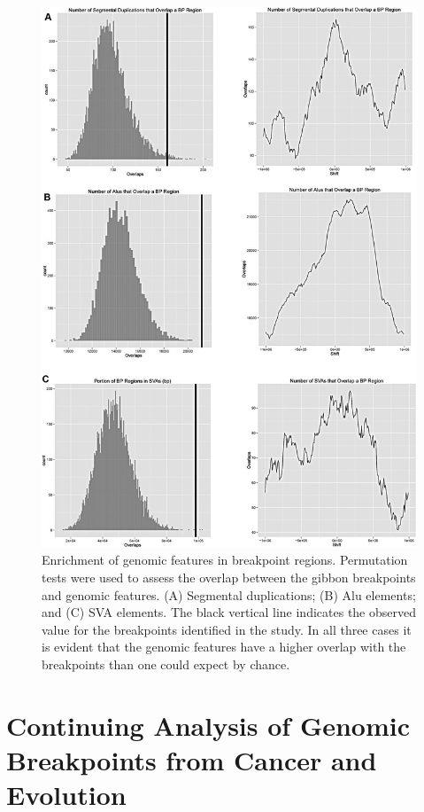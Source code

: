 \documentclass [11pt] {report}
\begin{document}
\begin{figure}
\centering
\includegraphics{figures/gibbon_bac_permutations.jpg}
\caption{Enrichment of genomic features in breakpoint regions. Permutation tests were used to assess the overlap between the gibbon breakpoints and genomic features. (A) Segmental duplications; (B) Alu elements; and (C) SVA elements. The black vertical line indicates the observed value for the breakpoints identified in the study. In all three cases it is evident that the genomic features have a higher overlap with the breakpoints than one could expect by chance.}
\label{gibbon_bac_permutations}

\end{figure}

\section{Continuing Analysis of Genomic Breakpoints from Cancer and Evolution}
\end{document}
